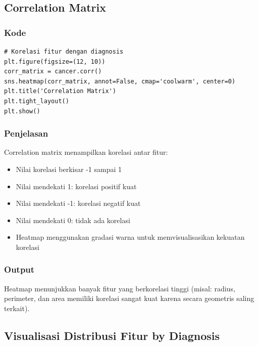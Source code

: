 \documentclass[12pt,a4paper]{article}
\begin{document}
\subsection{Correlation Matrix}

\subsubsection{Kode}
\begin{lstlisting}[style=pythonstyle]
# Korelasi fitur dengan diagnosis
plt.figure(figsize=(12, 10))
corr_matrix = cancer.corr()
sns.heatmap(corr_matrix, annot=False, cmap='coolwarm', center=0)
plt.title('Correlation Matrix')
plt.tight_layout()
plt.show()
\end{lstlisting}

\subsubsection{Penjelasan}
Correlation matrix menampilkan korelasi antar fitur:
\begin{itemize}
    \item Nilai korelasi berkisar -1 sampai 1
    \item Nilai mendekati 1: korelasi positif kuat
    \item Nilai mendekati -1: korelasi negatif kuat
    \item Nilai mendekati 0: tidak ada korelasi
    \item Heatmap menggunakan gradasi warna untuk memvisualisasikan kekuatan korelasi
\end{itemize}

\subsubsection{Output}
Heatmap menunjukkan banyak fitur yang berkorelasi tinggi (misal: radius, perimeter, dan area memiliki korelasi sangat kuat karena secara geometris saling terkait).

\subsection{Visualisasi Distribusi Fitur by Diagnosis}
\end{document}
